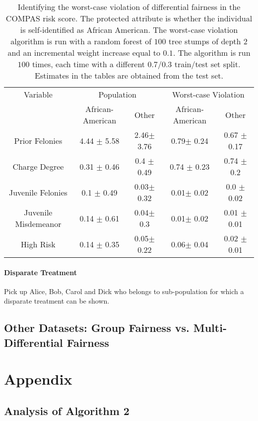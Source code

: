 \documentclass{article}
\begin{document}
\begin{table} [h!]
	\centering  
	\begin{tabular}{c|cc||cc} 
	Variable & \multicolumn{2}{c}{Population} & \multicolumn{2}{c}{Worst-case Violation} \\
                 & African-American & Other & African-American& Other \\
      \hline 
       \hline 
    Prior Felonies & 4.44 $\pm$ 5.58 & 2.46$\pm$ 3.76 & 0.79$\pm$ 0.24 & 0.67 $\pm$ 0.17 \\ 
    Charge Degree & 0.31 $\pm$ 0.46 & 0.4 $\pm$ 0.49 & 0.74 $\pm$ 0.23 & 0.74 $\pm$ 0.2  \\ 
    Juvenile Felonies & 0.1 $\pm$ 0.49 & 0.03$\pm$ 0.32 & 0.01$\pm$ 0.02 & 0.0 $\pm$ 0.02  \\
   Juvenile Misdemeanor & 0.14 $\pm$ 0.61 & 0.04$\pm$ 0.3 & 0.01$\pm$ 0.02 & 0.01 $\pm$ 0.01 \\ 
    \hline
    High Risk & 0.14 $\pm$ 0.35 & 0.05$\pm$ 0.22 & 0.06$\pm$ 0.04 & 0.02 $\pm$0.01 \\  
\end{tabular} 
\caption{Identifying the worst-case violation of differential fairness in the COMPAS risk score. The protected attribute is whether the individual is self-identified as African American. The worst-case violation algorithm is run with a random forest of $100$ tree stumps of depth 2 and an incremental weight increase equal to $0.1$. The algorithm is run $100$ times, each time with a different $0.7/0.3$ train/test set split. Estimates in the tables are obtained from the test set.   }
\label{tab: 2}
\end{table}


\paragraph{Disparate Treatment}
Pick up Alice, Bob, Carol and Dick who belongs to sub-population for which a disparate treatment can be shown. 


\subsection{Other Datasets: Group Fairness vs. Multi-Differential Fairness}


\section{Appendix}

\subsection{Analysis of Algorithm 2}
\end{document}
